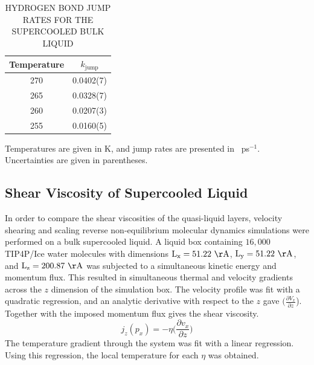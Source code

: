\begin{table}[h] \centering \caption{HYDROGEN BOND JUMP RATES FOR THE
    SUPERCOOLED BULK LIQUID\label{tab:bulkJump}}
\begin{tabular}{cc}
\hline
\hline
 Temperature & $k_\mathrm{jump}$ \\
\hline
270 & 0.0402(7) \\
265 & 0.0328(7) \\
260 & 0.0207(3)  \\
255 & 0.0160(5) \\
\hline
\hline
\end{tabular}
\begin{flushleft}
  Temperatures are given in K, and jump rates are presented in
  ~ps$^{-1}$. Uncertainties are given in parentheses.
\end{flushleft}
\end{table}

           

\subsection{Shear Viscosity of Supercooled Liquid}
In order to compare the shear viscosities of the quasi-liquid layers,
velocity shearing and scaling reverse non-equilibrium molecular
dynamics simulations were performed on a bulk supercooled liquid. A
liquid box containing $16,000$ TIP4P/Ice water molecules with
dimensions $\mathrm{L_x} = 51.22~\mathrm{\AA}$,
$\mathrm{L_y} = 51.22~\mathrm{\AA}$, and
$\mathrm{L_z}=200.87~\mathrm{\AA}$ was subjected to a simultaneous
kinetic energy and momentum flux. This resulted in simultaneous
thermal and velocity gradients across the $z$ dimension of the
simulation box. The velocity profile was fit with a quadratic
regression, and an analytic derivative with respect to the $z$ gave
$(\frac{\partial V_x}{\partial z}$). Together with the imposed
momentum flux gives the shear viscosity.
\begin{equation}\label{eq:viscosity}
  j_{z}(p_{x}) = -\eta \big(\frac{\partial v_{x}}{\partial z}\big)
\end{equation}
The temperature gradient through the system was fit with a linear
regression. Using this regression, the local temperature for each
$\eta$ was obtained.  

